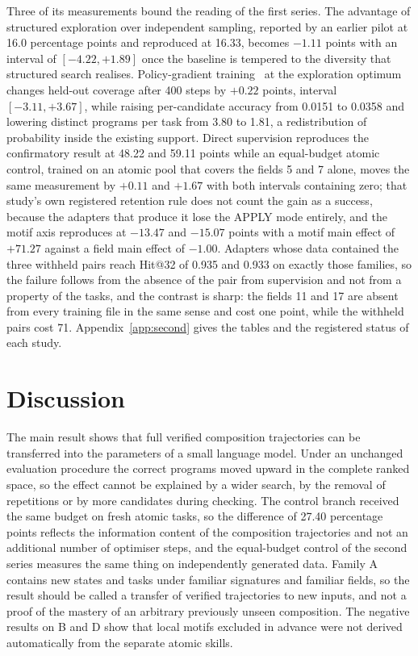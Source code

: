 \documentclass{zapiski}
\begin{document}
Three of its measurements bound the reading of the first series. The advantage of
structured exploration over independent sampling, reported by an earlier pilot at 16.0
percentage points and reproduced at 16.33, becomes $-1.11$ points with an interval of
$[-4.22, +1.89]$ once the baseline is tempered to the diversity that structured search
realises. Policy-gradient training~\cite{shao2024deepseekmath} at the exploration
optimum changes held-out coverage after 400 steps by $+0.22$ points, interval
$[-3.11, +3.67]$, while raising per-candidate accuracy from 0.0151 to 0.0358 and
lowering distinct programs per task from 3.80 to 1.81, a redistribution of probability
inside the existing support. Direct supervision reproduces the confirmatory result at
48.22 and 59.11 points while an equal-budget atomic control, trained on an atomic pool that
covers the fields 5 and 7 alone, moves the same measurement by $+0.11$ and $+1.67$ with
both intervals containing zero; that study's own registered
retention rule does not count the gain as a success, because the adapters that produce
it lose the APPLY mode entirely, and the motif axis
reproduces at $-13.47$ and $-15.07$ points with a motif main effect of $+71.27$ against
a field main effect of $-1.00$. Adapters whose data contained the three withheld pairs
reach Hit@32 of 0.935 and 0.933 on exactly those families, so the failure follows from
the absence of the pair from supervision and not from a property of the tasks, and the
contrast is sharp: the fields 11 and 17 are absent from every training file in the same
sense and cost one point, while the withheld pairs cost 71.
Appendix~\ref{app:second} gives the tables and the registered status of each study.

\section{Discussion}
\label{sec:discussion}

The main result shows that full verified composition trajectories can be transferred
into the parameters of a small language model. Under an unchanged evaluation procedure
the correct programs moved upward in the complete ranked space, so the effect cannot be
explained by a wider search, by the removal of repetitions or by more candidates during
checking. The control branch received the same budget on fresh atomic tasks, so the
difference of 27.40 percentage points reflects the information content of the
composition trajectories and not an additional number of optimiser steps, and the
equal-budget control of the second series measures the same thing on independently
generated data. Family A contains new states and tasks under familiar signatures and
familiar fields, so the result should be called a transfer of verified trajectories to
new inputs, and not a proof of the mastery of an arbitrary previously unseen
composition. The negative results on B and D show that local motifs excluded in advance
were not derived automatically from the separate atomic skills.
\end{document}
